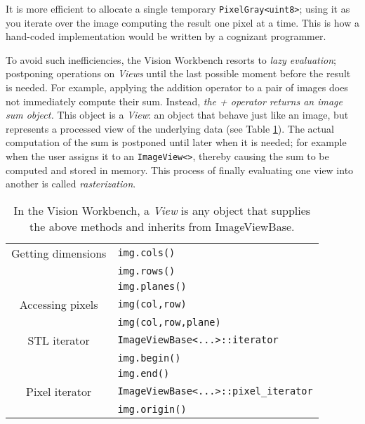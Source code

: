 It is more efficient to allocate a single temporary
\verb#PixelGray<uint8>#; using it as you iterate over the image
computing the result one pixel at a time.  This is how a hand-coded
implementation would be written by a cognizant programmer.

To avoid such inefficiencies, the Vision Workbench resorts to {\em
  lazy evaluation}; postponing operations on {\em Views} until the
last possible moment before the result is needed.  For example,
applying the addition operator to a pair of images does not
immediately compute their sum.  Instead, {\em the + operator returns
  an image sum object.}  This object is a {\em View}: an object that
behave just like an image, but represents a processed view of the
underlying data (see Table \ref{tbl:view-concept}).  The actual
computation of the sum is postponed until later when it is needed; for
example when the user assigns it to an \verb#ImageView<>#, thereby
causing the sum to be computed and stored in memory.  This process of
finally evaluating one view into another is called {\em
  rasterization}.
  \begin{table}[tb]\begin{centering}
 \begin{tabular}{|c|l|} \hline
   Getting dimensions & 	\verb#img.cols()#    \\
                      &   \verb#img.rows()#   \\
                      &   \verb#img.planes()# \\
   \hline
   Accessing pixels  & \verb#img(col,row)# \\
                     & \verb#img(col,row,plane)# \\
   \hline
   STL iterator      & \verb#ImageViewBase<...>::iterator# \\
                     & \verb#img.begin()# \\
                     & \verb#img.end()#\\
   \hline
   Pixel iterator   & \verb#ImageViewBase<...>::pixel_iterator# \\ 
                    & \verb#img.origin()# \\
   \hline
 \end{tabular}
 \caption{In the Vision Workbench, a {\em View} is any object that supplies the above methods and inherits from ImageViewBase.}
 \label{tbl:view-concept}
 \end{centering}\end{table}

